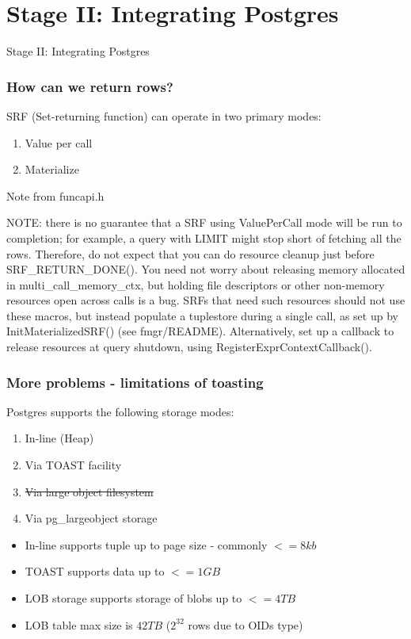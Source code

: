 \section{Stage II: Integrating Postgres}
\begin{frame}[plain,c]
\begin{center}
\Huge Stage II: Integrating Postgres
\end{center}
\end{frame}

\begin{frame}[fragile]
  \frametitle{How can we return rows?}
  SRF (Set-returning function) can operate in two primary modes:
  \begin{enumerate}
  \item Value per call
  \item Materialize
  \end{enumerate}

  \begin{exampleblock}{Note from funcapi.h}\tiny
    \par\medskip
    NOTE: there is no guarantee that a SRF using ValuePerCall mode will be
    run to completion; for example, a query with LIMIT might stop short of
    fetching all the rows.  Therefore, do not expect that you can do resource
    cleanup just before SRF\_RETURN\_DONE().  You need not worry about releasing
    memory allocated in multi\_call\_memory\_ctx, but holding file descriptors or
    other non-memory resources open across calls is a bug.  SRFs that need
    such resources should not use these macros, but instead populate a
    tuplestore during a single call, as set up by InitMaterializedSRF() (see
    fmgr/README).  Alternatively, set up a callback to release resources
    at query shutdown, using RegisterExprContextCallback().
  \end{exampleblock}
\end{frame}

\begin{frame}[fragile]
  \frametitle{More problems - limitations of toasting}

  Postgres supports the following storage modes:
  \begin{enumerate}
  \item In-line (Heap)
  \item Via TOAST facility 
  \item \sout{Via large object filesystem}
  \item Via pg\_largeobject storage
  \end{enumerate}
  
  \begin{itemize}
    \item In-line supports tuple up to page size - commonly $<=8kb$
    \item TOAST supports data up to $<=1GB$
    \item LOB storage supports storage of blobs up to $<=4TB$
    \item LOB table max size is $42TB$ ($2^{32}$ rows due to OIDs type)
  \end{itemize}

\end{frame}

